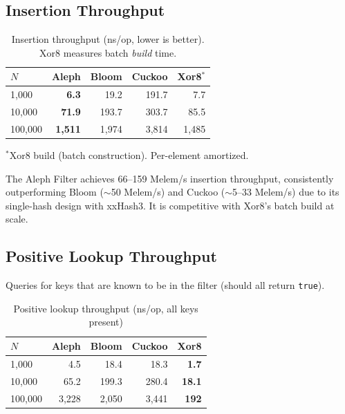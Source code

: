   \subsection{Insertion Throughput}

  \begin{table}[H]
    \centering
    \caption{Insertion throughput (ns/op, lower is better). Xor8 measures batch \emph{build} time.}
    \label{tab:insert}
    \begin{tabular}{l r r r r}
      \hline
      \textbf{$N$} & \textbf{Aleph} & \textbf{Bloom} & \textbf{Cuckoo} & \textbf{Xor8$^*$} \\
      \hline
      1{,}000   & \textbf{6.3}  & 19.2 & 191.7 & 7.7  \\
      10{,}000  & \textbf{71.9} & 193.7 & 303.7 & 85.5 \\
      100{,}000 & \textbf{1{,}511} & 1{,}974 & 3{,}814 & 1{,}485 \\
      \hline
    \end{tabular}

    \smallskip
    {\small $^*$Xor8 build (batch construction). Per-element amortized.}
  \end{table}

  \begin{insightbox}
    The Aleph Filter achieves 66--159 Melem/s insertion throughput, consistently
    outperforming Bloom ($\sim$50 Melem/s) and Cuckoo ($\sim$5--33 Melem/s) due
    to its single-hash design with xxHash3. It is competitive with Xor8's batch
    build at scale.
  \end{insightbox}

  \subsection{Positive Lookup Throughput}

  Queries for keys that are known to be in the filter (should all return \texttt{true}).

  \begin{table}[H]
    \centering
    \caption{Positive lookup throughput (ns/op, all keys present)}
    \label{tab:lookup-pos}
    \begin{tabular}{l r r r r}
      \hline
      \textbf{$N$} & \textbf{Aleph} & \textbf{Bloom} & \textbf{Cuckoo} & \textbf{Xor8} \\
      \hline
      1{,}000   & 4.5    & 18.4  & 18.3  & \textbf{1.7}  \\
      10{,}000  & 65.2   & 199.3 & 280.4 & \textbf{18.1} \\
      100{,}000 & 3{,}228 & 2{,}050 & 3{,}441 & \textbf{192}  \\
      \hline
    \end{tabular}
  \end{table}

